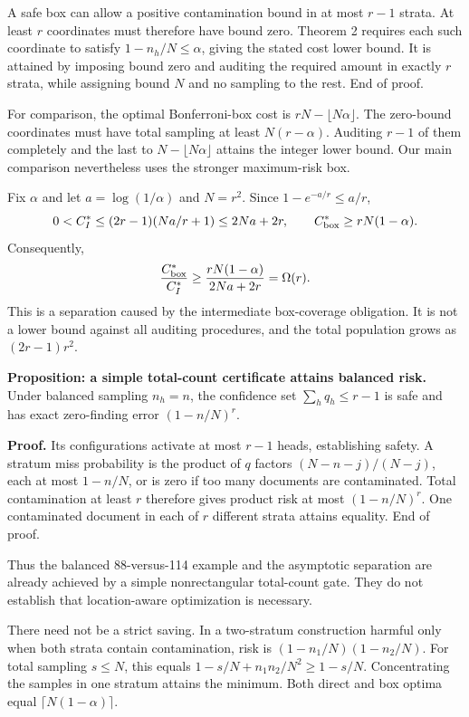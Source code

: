 \documentclass[11pt]{article}
\begin{document}
A safe box can allow a positive contamination bound in at most $r-1$ strata. At least $r$ coordinates must therefore have bound zero. Theorem 2 requires each such coordinate to satisfy $1-n_h/N\le\alpha$, giving the stated cost lower bound. It is attained by imposing bound zero and auditing the required amount in exactly $r$ strata, while assigning bound $N$ and no sampling to the rest. End of proof.

For comparison, the optimal Bonferroni-box cost is $rN-\lfloor N\alpha\rfloor$. The zero-bound coordinates must have total sampling at least $N(r-\alpha)$. Auditing $r-1$ of them completely and the last to $N-\lfloor N\alpha\rfloor$ attains the integer lower bound. Our main comparison nevertheless uses the stronger maximum-risk box.

Fix $\alpha$ and let $a=\log(1/\alpha)$ and $N=r^2$. Since $1-e^{-a/r}\le a/r$,
\[
0<C_I^*\le (2r-1)(Na/r+1)\le2Na+2r,\qquad
C_{\rm box}^*\ge rN(1-\alpha).
\]
Consequently,
\[
\frac{C_{\rm box}^*}{C_I^*}\ge
\frac{rN(1-\alpha)}{2Na+2r}=\Omega(r).
\]
This is a separation caused by the intermediate box-coverage obligation. It is not a lower bound against all auditing procedures, and the total population grows as $(2r-1)r^2$.

\textbf{Proposition: a simple total-count certificate attains balanced risk.} Under balanced sampling $n_h=n$, the confidence set $\sum_hq_h\le r-1$ is safe and has exact zero-finding error $(1-n/N)^r$.

\textbf{Proof.} Its configurations activate at most $r-1$ heads, establishing safety. A stratum miss probability is the product of $q$ factors $(N-n-j)/(N-j)$, each at most $1-n/N$, or is zero if too many documents are contaminated. Total contamination at least $r$ therefore gives product risk at most $(1-n/N)^r$. One contaminated document in each of $r$ different strata attains equality. End of proof.

Thus the balanced 88-versus-114 example and the asymptotic separation are already achieved by a simple nonrectangular total-count gate. They do not establish that location-aware optimization is necessary.

There need not be a strict saving. In a two-stratum construction harmful only when both strata contain contamination, risk is $(1-n_1/N)(1-n_2/N)$. For total sampling $s\le N$, this equals $1-s/N+n_1n_2/N^2\ge1-s/N$. Concentrating the samples in one stratum attains the minimum. Both direct and box optima equal $\lceil N(1-\alpha)\rceil$.
\end{document}
